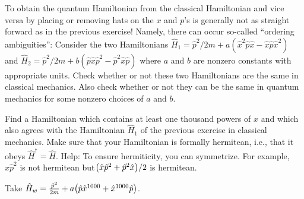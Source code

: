 \documentclass[boxes]{homework}
\makeatletter
\numberwithin{@problem}{section}
\makeatother
\begin{document}
\begin{solution}

\end{solution}

\begin{problem}
To obtain the quantum Hamiltonian from the classical Hamiltonian and vice versa by placing or removing hats on the $x$ and $p$’s is generally not as straight forward as in the previous exercise! Namely, there can occur so-called ``ordering ambiguities'': Consider the two Hamiltonians $\hat{H}_1 = \hat{p}^2/2m + a(\hat{x}^2\hat{p}\hat{x} - \hat{x}\hat{p}\hat{x}^2)$
and
$\hat{H}_2 = \hat{p}^2/2m + b(\hat{p}\hat{x}\hat{p}^2 - \hat{p}^2\hat{x}\hat{p})$ where $a$ and $b$ are nonzero constants with appropriate units. Check whether or not these two Hamiltonians are the same in classical mechanics. Also check whether or not they can be the same in quantum mechanics for some nonzero choices of $a$ and $b$.
\end{problem}

\begin{solution}

\end{solution}

\begin{problem}
Find a Hamiltonian which contains at least one thousand powers of $\hat{x}$ and which also agrees with the Hamiltonian $\hat{H}_1$ of the previous exercise in classical mechanics. Make sure that your Hamiltonian is formally hermitean, i.e., that it obeys $\hat{H}^\dagger = \hat{H}$. Help: To ensure hermiticity, you can symmetrize. For example, $\hat{x}\hat{p}^2$ is not hermitean but$\qty(\hat{x}\hat{p}^2 + \hat{p}^2\hat{x})/2$ is hermitean.
\end{problem}

\begin{solution}
	Take $\hat{H}_w = \frac{\hat{p}^2}{2m} + a\qty(\hat{p}\hat{x}^{1000} + \hat{x}^{1000}\hat{p})$.
\end{solution}
\end{document}
